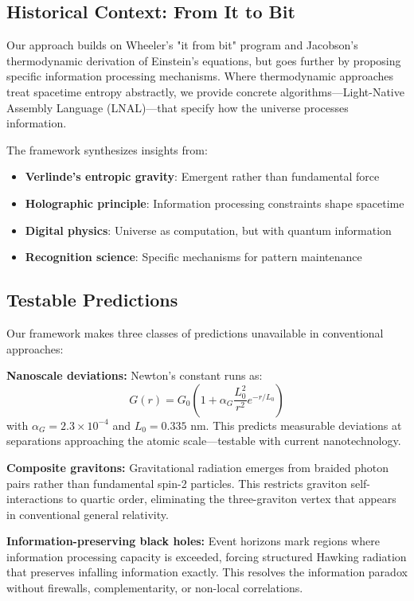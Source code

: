 \documentclass[12pt]{article}
\begin{document}
\subsection{Historical Context: From It to Bit}

Our approach builds on Wheeler's "it from bit" program and Jacobson's thermodynamic derivation of Einstein's equations, but goes further by proposing specific information processing mechanisms. Where thermodynamic approaches treat spacetime entropy abstractly, we provide concrete algorithms—Light-Native Assembly Language (LNAL)—that specify how the universe processes information.

The framework synthesizes insights from:
\begin{itemize}
\item \textbf{Verlinde's entropic gravity}: Emergent rather than fundamental force
\item \textbf{Holographic principle}: Information processing constraints shape spacetime
\item \textbf{Digital physics}: Universe as computation, but with quantum information
\item \textbf{Recognition science}: Specific mechanisms for pattern maintenance
\end{itemize}

\subsection{Testable Predictions}

Our framework makes three classes of predictions unavailable in conventional approaches:

\textbf{Nanoscale deviations:} Newton's constant runs as:
\begin{equation}
G(r) = G_0\left(1 + \alpha_G \frac{L_0^2}{r^2} e^{-r/L_0}\right)
\end{equation}
with $\alpha_G = 2.3 \times 10^{-4}$ and $L_0 = 0.335$ nm. This predicts measurable deviations at separations approaching the atomic scale—testable with current nanotechnology.

\textbf{Composite gravitons:} Gravitational radiation emerges from braided photon pairs rather than fundamental spin-2 particles. This restricts graviton self-interactions to quartic order, eliminating the three-graviton vertex that appears in conventional general relativity.

\textbf{Information-preserving black holes:} Event horizons mark regions where information processing capacity is exceeded, forcing structured Hawking radiation that preserves infalling information exactly. This resolves the information paradox without firewalls, complementarity, or non-local correlations.
\end{document}
